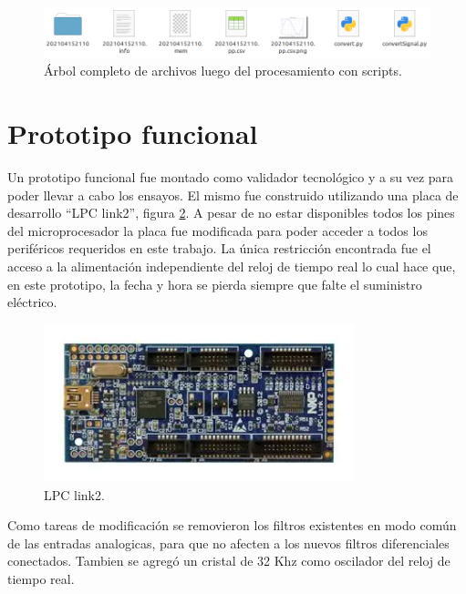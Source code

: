 \vspace{5mm}

\begin{figure}[ht]
	\centering
	\includegraphics[width=140mm]{./Figures/firmAllFiles.png}
	\caption{Árbol completo de archivos luego del procesamiento con scripts.}
	\label{fig:firmAllFiles}
\end{figure}

\section{Prototipo funcional}

Un prototipo funcional fue montado como validador tecnológico y a su vez para poder llevar a cabo los ensayos. El mismo fue construido utilizando una placa de desarrollo \enquote{LPC link2}, figura \ref{fig:hardLPC}. A pesar de no estar disponibles todos los pines del microprocesador la placa fue modificada para poder acceder a todos los periféricos requeridos en este trabajo. La única restricción encontrada fue el acceso a la alimentación independiente del reloj de tiempo real lo cual hace que, en este prototipo, la fecha y hora se pierda siempre que falte el suministro eléctrico. 

\begin{figure}[ht]
	\centering
	\includegraphics[width=90mm]{./Figures/hardLPC.png}
	\caption{LPC link2.}
	\label{fig:hardLPC}
\end{figure}

\vspace{10mm}

Como tareas de modificación se removieron los filtros existentes en modo común de las entradas analogicas, para que no afecten a los nuevos filtros diferenciales conectados. Tambien se agregó un cristal de 32 Khz como oscilador del reloj de tiempo real.

